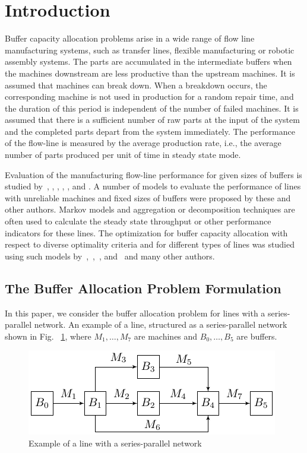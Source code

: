 \documentclass{ifacconf}
\begin{document}
\section{Introduction}

Buffer  capacity  allocation  problems  arise  in  a  wide  range  of  flow line manufacturing  systems, 
such  as  transfer  lines,  flexible  manufacturing  or  robotic  assembly  systems. 
The parts are accumulated in the intermediate buffers when the machines downstream are less productive than the upstream machines. 
It is assumed that machines can break down. When a breakdown occurs, the corresponding 
machine is not used in production for a random repair time, and the duration of this period is independent of the 
number of failed machines. It is assumed that there is a sufficient number of raw parts at 
the input of the system and the completed parts depart 
from the system immediately. The performance of the flow-line is measured by
the average production rate, i.e., the average number of parts produced per 
unit of time in steady state mode.

Evaluation  of the manufacturing flow-line performance for given sizes of buffers is studied 
by~\cite{Proth84}, \cite{DG92}, \cite{Gershwin1993}, \cite{HPB1993}, \cite{Meerkov2009}, and \cite{TanGer09}. A number of
 models to evaluate the performance of lines with unreliable machines and fixed sizes of buffers were proposed by these and other authors. 
Markov models and aggregation or decomposition techniques are often used to calculate the
steady state throughput or other performance indicators for these lines.  
The  optimization  for  buffer  capacity  allocation with 
respect to diverse optimality criteria and for different types of lines was studied 
using such models by~\cite{SmiDas88},~\cite{So97},~\cite{GS},  and~\cite{ShiGer2009} and many other authors. 

\subsection{The Buffer Allocation Problem Formulation} \label{bap_formulation}

In this paper, we consider the buffer allocation problem for lines with a series-parallel network. 
An example of a line, structured as a series-parallel network shown in Fig. ~\ref{lineexample}, where $M_1,…,M_7$ are machines and $B_0,…,B_5$ are buffers.

 \begin{figure}[h!]
	\centering
	\includegraphics[scale=0.9]{LineSchems}
  \caption{Example of a line with a series-parallel network\label{lineexample}}
  \end{figure}
\end{document}
